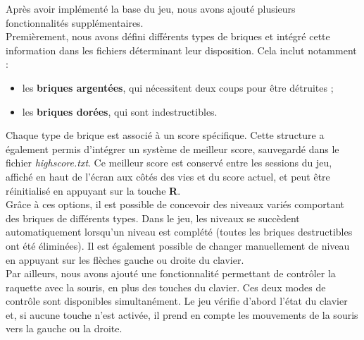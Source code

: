 \documentclass{article}
\begin{document}
\noindent Après avoir implémenté la base du jeu, nous avons ajouté plusieurs fonctionnalités supplémentaires. \\

\noindent Premièrement, nous avons défini différents types de briques et intégré cette information dans les fichiers déterminant leur disposition. Cela inclut notamment :  
\begin{itemize}
    \item les \textbf{briques argentées}, qui nécessitent deux coups pour être détruites ;
    \item les \textbf{briques dorées}, qui sont indestructibles.
\end{itemize}
\noindent Chaque type de brique est associé à un score spécifique. Cette structure a également permis d’intégrer un système de meilleur score, sauvegardé dans le fichier \textit{highscore.txt}. Ce meilleur score est conservé entre les sessions du jeu, affiché en haut de l’écran aux côtés des vies et du score actuel, et peut être réinitialisé en appuyant sur la touche \textbf{R}. \\

\noindent Grâce à ces options, il est possible de concevoir des niveaux variés comportant des briques de différents types. Dans le jeu, les niveaux se succèdent automatiquement lorsqu’un niveau est complété (toutes les briques destructibles ont été éliminées). Il est également possible de changer manuellement de niveau en appuyant sur les flèches gauche ou droite du clavier. \\

\noindent Par ailleurs, nous avons ajouté une fonctionnalité permettant de contrôler la raquette avec la souris, en plus des touches du clavier. Ces deux modes de contrôle sont disponibles simultanément. Le jeu vérifie d'abord l’état du clavier et, si aucune touche n’est activée, il prend en compte les mouvements de la souris vers la gauche ou la droite. \\
\end{document}
